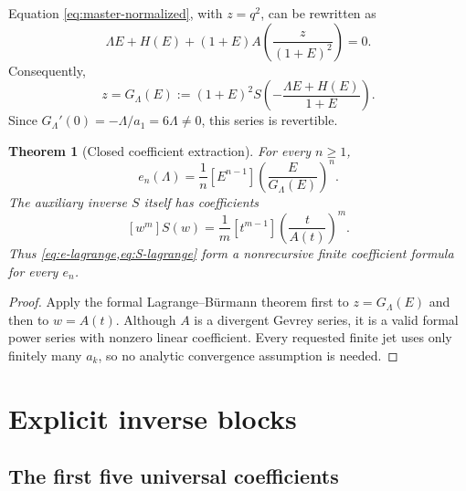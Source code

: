 \documentclass[11pt,a4paper,oneside]{book}
\newtheorem{theorem}{Theorem}[chapter]
\newcommand{\coeff}[2]{\left[#1\right]#2}
\begin{document}
Equation \cref{eq:master-normalized}, with \(z=q^2\), can be rewritten as
\begin{equation}\label{eq:A-compressed}
 \Lambda E+H(E)
 +(1+E)A\!\left(\frac{z}{(1+E)^2}\right)=0.
\end{equation}
Consequently,
\begin{equation}\label{eq:G-Lambda}
 z=G_\Lambda(E):=
 (1+E)^2
 S\!\left(
  -\frac{\Lambda E+H(E)}{1+E}
 \right).
\end{equation}
Since \(G_\Lambda'(0)=-\Lambda/a_1=6\Lambda\ne0\), this series is revertible.

\begin{theorem}[Closed coefficient extraction]\label{thm:lagrange-closed}
For every \(n\ge1\),
\begin{equation}\label{eq:e-lagrange}
 \boxed{
 e_n(\Lambda)
 =\frac1n\coeff{E^{n-1}}{
  \left(\frac{E}{G_\Lambda(E)}\right)^n}.}
\end{equation}
The auxiliary inverse \(S\) itself has coefficients
\begin{equation}\label{eq:S-lagrange}
 \coeff{w^m}{S(w)}
 =\frac1m\coeff{t^{m-1}}{
   \left(\frac{t}{A(t)}\right)^m}.
\end{equation}
Thus \cref{eq:e-lagrange,eq:S-lagrange} form a nonrecursive finite
coefficient formula for every \(e_n\).
\end{theorem}

\begin{proof}
Apply the formal Lagrange--B\"urmann theorem first to \(z=G_\Lambda(E)\) and
then to \(w=A(t)\).  Although \(A\) is a divergent Gevrey series, it is a valid
formal power series with nonzero linear coefficient.  Every requested finite
jet uses only finitely many \(a_k\), so no analytic convergence assumption is
needed.
\end{proof}

\chapter{Explicit inverse blocks}

\section{The first five universal coefficients}
\end{document}
